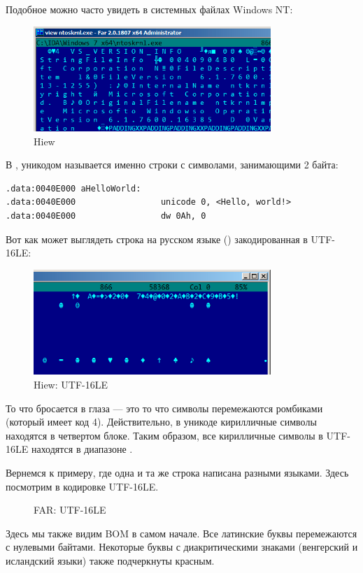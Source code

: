 Подобное можно часто увидеть в системных файлах \gls{Windows NT}:

\begin{figure}[H]
\centering
\includegraphics[width=0.8\textwidth]{digging_into_code/strings/ntoskrnl_UTF16.png}
\caption{Hiew}
\end{figure}

В \IDA, уникодом называется именно строки с символами, занимающими 2 байта:

\begin{lstlisting}[style=customasmx86]
.data:0040E000 aHelloWorld:
.data:0040E000                 unicode 0, <Hello, world!>
.data:0040E000                 dw 0Ah, 0
\end{lstlisting}

Вот как может выглядеть строка на русском языке () закодированная в UTF-16LE:

\begin{figure}[H]
\centering
\includegraphics[width=0.8\textwidth]{digging_into_code/strings/russian_UTF16.png}
\caption{Hiew: UTF-16LE}
\end{figure}

То что бросается в глаза --- это то что символы перемежаются ромбиками (который имеет код 4).
Действительно, в уникоде кирилличные символы находятся в четвертом блоке.
Таким образом, все кирилличные символы в UTF-16LE находятся в диапазоне .

Вернемся к примеру, где одна и та же строка написана разными языками.
Здесь посмотрим в кодировке UTF-16LE.

\begin{figure}[H]
\centering
{}
\caption{FAR: UTF-16LE}
\end{figure}

Здесь мы также видим \ac{BOM} в самом начале.
Все латинские буквы перемежаются с нулевыми байтами.
Некоторые буквы с диакритическими знаками (венгерский и исландский языки) также подчеркнуты красным.



